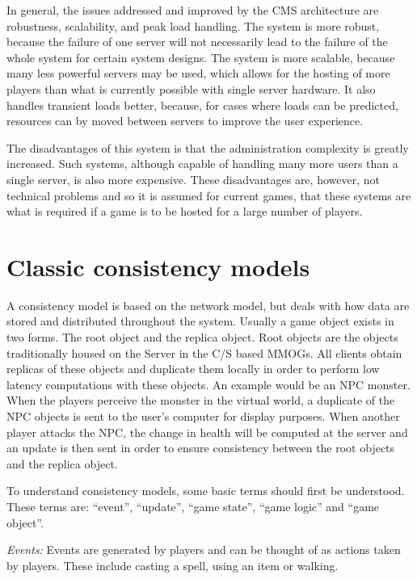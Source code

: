 \documentclass[10pt,a4paper,journal,cspaper,compsoc]{IEEEtran}
\begin{document}
In general, the issues addressed and improved by the \ac{CMS} architecture are robustness, scalability, and peak load handling. The system is more
robust, because the failure of one server will not necessarily lead to the failure of the whole system for certain system designs. The system is more
scalable, because many less powerful servers may be used, which allows for the hosting of more players than what is currently possible with single
server hardware. It also handles transient loads better, because, for cases where loads can be predicted, resources can by moved between servers to
improve the user experience.

The disadvantages of this system is that the administration complexity is greatly increased. Such systems, although capable of handling many more
users than a single server, is also more expensive. These disadvantages are, however, not technical problems and so it is assumed for current games,
that these systems are what is required if a game is to be hosted for a large number of players.

\section{Classic consistency models}
\label{classic_models}

A consistency model is based on the network model, but deals with how data are stored and distributed throughout the system. Usually a game object
exists in two forms. The root object and the replica object. Root objects are the objects traditionally housed on the Server in the C/S based MMOGs.
All clients obtain replicas of these objects and duplicate them locally in order to perform low latency computations with these objects. An example
would be an NPC monster. When the players perceive the monster in the virtual world, a duplicate of the NPC objects is sent to the user's computer
for display purposes. When another player attacks the NPC, the change in health will be computed at the server and an update is then sent in order to
ensure consistency between the root objects and the replica object.

To understand consistency models, some basic terms should first be understood. These terms are: ``event'', ``update'', ``game state'', ``game logic''
and ``game object''.

\emph{Events:} Events are generated by players and can be thought of as actions taken by players. These include casting a spell, using an item
    or walking.
\end{document}

